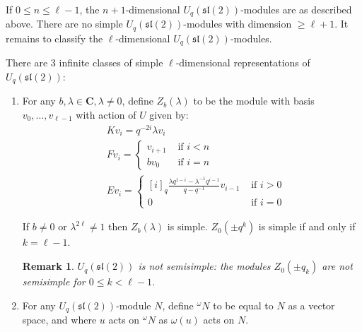 \documentclass[]{article}
\newtheorem{remark}{Remark}
\begin{document}
If $0 \leq n \leq \ell - 1$, the $n+1$-dimensional
$U_q(\mathfrak{sl}(2))$-modules are as described above. %
There are no simple $U_q(\mathfrak{sl}(2))$-modules with dimension $\geq
\ell+1$. It remains to classify the $\ell$-dimensional
$U_q(\mathfrak{sl}(2))$-modules.

There are $3$ infinite classes of simple $\ell$-dimensional representations of  $U_q(\mathfrak{sl}(2))$:
\begin{enumerate}
        \item For any $b,\lambda \in \mathbf{C}, \lambda \neq 0$, define
            $Z_b(\lambda)$ to be the module with basis $v_0, \ldots, v_{\ell -
            1}$ with action of $U$ given by: 
\begin{align*}
    &K v_i = q^{-2i} \lambda v_i \\
    &F v_i = \begin{cases} v_{i+1}& \text{ if $i < n$} \\  b v_0& \text{ if $i = n$} \end{cases}  \\
    &E v_i = \begin{cases} 
        [i]_q \frac{\lambda q^{1-i} - \lambda^{-1} q^{i-1}}{q - q^{-1}} v_{i-1}& \text{ if $i > 0$} \\ 
                    0& \text{ if $i = 0$} 
             \end{cases} 
\end{align*}

If $b \neq 0$ or $\lambda^{2\ell}\neq 1$ then $Z_b(\lambda)$ is simple.
$Z_0(\pm q^k)$ is simple if and only if $k = \ell - 1$. 

\begin{remark}
    $U_q(\mathfrak{sl}(2))$ is not semisimple: the modules $Z_0(\pm q_k)$ are not semisimple for $0 \leq k < \ell - 1$.
\end{remark}
\item For any $U_q(\mathfrak{sl}(2))$-module $N$, define $^\omega N$ to be
    equal to $N$ as a vector space, and where $u$ acts on $^\omega N$ as
    $\omega(u)$ acts on $N$.


\end{enumerate}
\end{document}
